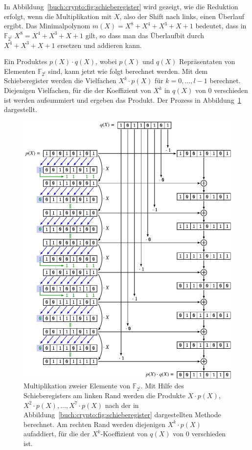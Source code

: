 In Abbildung~\ref{buch:crypto:fig:schieberegister} wird gezeigt,
wie die Reduktion erfolgt, wenn die Multiplikation mit $X$, also der
Shift nach links, einen Überlauf ergibt.
Das Minimalpolynom $m(X)=X^8+X^4+X^3+X+1$ bedeutet, dass in $\mathbb{F}_{2^l}$
$X^8=X^4+X^3+X+1$ gilt, so dass man das Überlaufbit durch 
$X^4+X^3+X+1$ ersetzen und addieren kann.

Ein Produktes $p(X)\cdot q(X)$, wobei $p(X)$ und
$q(X)$ Repräsentaten von Elementen $\mathbb{F}_{2^l}$ sind, kann jetzt
wie folgt berechnet werden.
Mit dem Schieberegister werden die Vielfachen $X^k\cdot p(X)$ 
für $k=0,\dots,l-1$ berechnet.
Diejenigen Vielfachen, für die der Koeffizient von $X^k$ in $q(X)$
von $0$ verschieden ist werden aufsummiert und ergeben das Produkt.
Der Prozess in Abbildung~\ref{buch:crypto:fig:multiplikation}
dargestellt.

\begin{figure}
\centering
\includegraphics[width=\textwidth]{chapters/90-crypto/images/multiplikation.pdf}
\caption{Multiplikation zweier Elemente von $\mathbb{F}_{2^l}$.
Mit Hilfe des Schieberegisters am linken Rand werden die Produkte 
$X\cdot p(X)$, $X^2\cdot p(X),\dots,X^7\cdot p(X)$ nach der in
Abbildung~\ref{buch:crypto:fig:schieberegister} dargestellten
Methode berechnet.
Am rechten Rand werden diejenigen $X^k\cdot p(X)$ aufaddiert,
für die der $X^k$-Koeffizient von $q(X)$ von $0$ verschieden ist.
\label{buch:crypto:fig:multiplikation}}
\end{figure}



